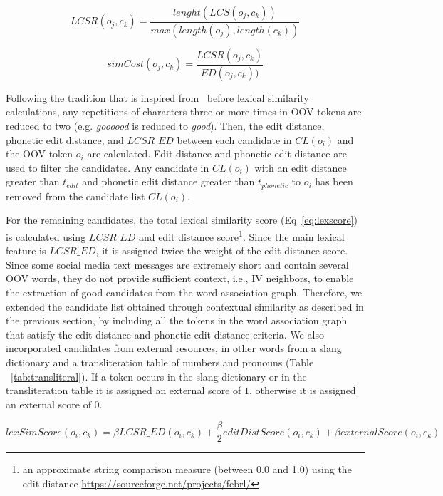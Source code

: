 \documentclass[a4paper,onesided,12pt]{report}
\begin{document}
\begin{equation}
LCSR(o_j,c_k) = \frac{lenght(LCS(o_j,c_k))}{max(length(o_j),length(c_k))}
\label{eq:lcsr}
\end{equation}


\begin{equation}
simCost (o_j,c_k) = \frac{LCSR(o_j,c_k)}{ED(o_j,c_k))}
\label{eq:lcsr_cont}
\end{equation}

Following the tradition that is inspired from~\cite{Kaufmann2010} before lexical similarity calculations, any repetitions of characters three or more times in OOV tokens are reduced to two (e.g. \emph{goooood} is reduced to \emph{good}). Then, the edit distance, phonetic edit distance, and $LCSR\_ED$ between each candidate in $CL(o_{i})$ and the OOV token $o_i$ are calculated. Edit distance and phonetic edit distance are used to filter the candidates. Any candidate in $CL(o_{i})$ with an edit distance greater than $t_{edit}$ and phonetic edit distance greater than $t_{phonetic}$ to $o_i$ has been removed from the candidate list $CL(o_{i})$.

For the remaining candidates, the total lexical similarity score (Eq~\ref{eq:lexscore}) is calculated using $LCSR\_ED$ and edit distance score\footnote{an approximate string comparison measure (between 0.0 and 1.0) using the edit distance \url{https://sourceforge.net/projects/febrl/}}. Since the main lexical feature is $LCSR\_ED$, it is assigned twice the weight of the edit distance score. Since some social media text messages are extremely short and contain several OOV words, they do not provide sufficient context, i.e., IV neighbors, to enable the extraction of good candidates from the word association graph. Therefore, we extended the candidate list obtained through contextual similarity as described in the previous section, by including all the tokens in the word association graph that satisfy the edit distance and phonetic edit distance criteria. We also incorporated candidates from external resources, in other words from a slang dictionary and a transliteration table of numbers and pronouns (Table ~\ref{tab:transliteral}). If a token occurs in the slang dictionary or in the transliteration table it is assigned an external score of $1$, otherwise it is assigned an external score of $0$.

\begin{equation}
lexSimScore(o_i,c_k) = \beta LCSR\_ED(o_i,c_k) + \frac{\beta} 2 editDistScore(o_i,c_k) + \beta externalScore(o_i,c_k)
\label{eq:lexscore}
\end{equation}
\end{document}
